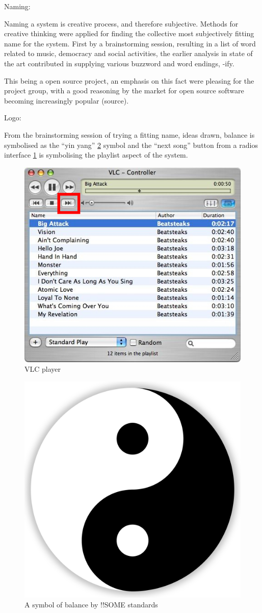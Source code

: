 Naming:

Naming a system is creative process, and therefore subjective. Methods for creative thinking were applied for finding the collective most subjectively fitting name for the system. First by a brainstorming session, resulting in a list of word related to music, democracy and social activities, the earlier analysis in state of the art contributed in supplying various buzzword and word endings, -ify.

This being a open source project, an emphasis on this fact were pleasing for the project group, with a good reasoning by the market for open source software becoming increasingly popular (source).

Logo:

From the brainstorming session of trying a fitting name, ideas drawn, balance is symbolised as the \enquote{yin yang} \cref{fig:yinyang} symbol and the \enquote{next song} button from a radios interface \cref{fig:vlc} is symbolising the playlist aspect of the system.

\begin{figure}
  \centering
  \includegraphics[width=0.5\linewidth]{Images/vlc.jpg}
  \caption{VLC player}
  \label{fig:vlc}
\end{figure}

\begin{figure}
  \centering
  \includegraphics[width=0.5\linewidth]{Images/Yin-Yang.png}
  \caption{A symbol of balance by !!SOME standards}
  \label{fig:yinyang}
\end{figure}


